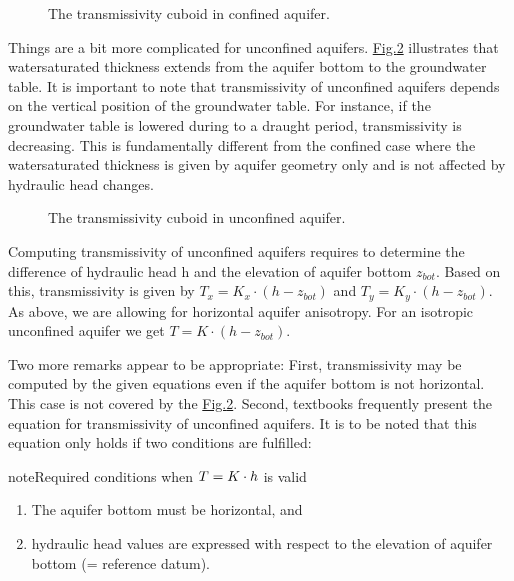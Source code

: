 \documentclass[letterpaper,10pt,english]{jupyterBook}
\begin{document}
\begin{figure}[htbp]
\centering
\capstart

\noindent{}
\caption{The transmissivity cuboid in confined aquifer.}\label{\detokenize{content/flow/L8/18_wells:trans-c-2d}}\end{figure}

\sphinxAtStartPar
Things are a bit more complicated for unconfined aquifers.  \hyperref[\detokenize{content/flow/L8/18_wells:trans-u-2d}]{Fig.\@ \ref{\detokenize{content/flow/L8/18_wells:trans-u-2d}}} illustrates that water\sphinxhyphen{}saturated thickness extends from the aquifer bottom to the groundwater table. It is important to note that transmissivity of unconfined aquifers depends on the vertical position of the groundwater table. For instance, if the groundwater table is lowered during to a draught period, transmissivity is decreasing. This is fundamentally different from the confined case where the water\sphinxhyphen{}saturated thickness is given by aquifer geometry only and is not affected by hydraulic head changes.

\begin{figure}[htbp]
\centering
\capstart

\noindent{}
\caption{The transmissivity cuboid in unconfined aquifer.}\label{\detokenize{content/flow/L8/18_wells:trans-u-2d}}\end{figure}

\sphinxAtStartPar
Computing transmissivity of unconfined aquifers requires to determine the difference of hydraulic head h and the elevation of aquifer bottom \(z_{bot}\). Based on this, transmissivity is given by \(T_x = K_x\cdot(h - z_{bot})\) and \(T_y = K_y\cdot(h - z_{bot})\). As above, we are allowing for horizontal aquifer anisotropy. For an isotropic unconfined aquifer we get \(T = K\cdot(h - z_{bot})\).

\sphinxAtStartPar
Two more remarks appear to be appropriate: First, transmissivity may be computed by the given equations even if the aquifer bottom is not horizontal. This case is not covered by the \hyperref[\detokenize{content/flow/L8/18_wells:trans-u-2d}]{Fig.\@ \ref{\detokenize{content/flow/L8/18_wells:trans-u-2d}}}. Second, textbooks frequently present the equation  for transmissivity of unconfined aquifers. It is to be noted that this equation only holds if two conditions are fulfilled:

\begin{sphinxadmonition}{note}{Required conditions when \protect\(T = K\cdot h\protect\) is valid}
\begin{enumerate}
%
\item {} 
\sphinxAtStartPar
The aquifer bottom must be horizontal, and

\item {} 
\sphinxAtStartPar
hydraulic head values are expressed with respect to the elevation of aquifer bottom (= reference datum).

\end{enumerate}
\end{sphinxadmonition}
\end{document}
